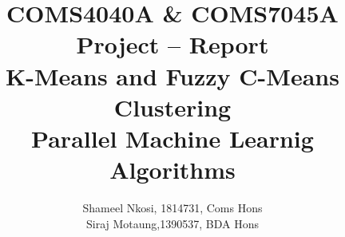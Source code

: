 


\title{COMS4040A \& COMS7045A Project  -- Report
    \\  K-Means and Fuzzy C-Means Clustering
    \\ Parallel Machine Learnig Algorithms
    }
\author{Shameel Nkosi, 1814731,  Coms Hons \\
        Siraj Motaung,1390537, BDA Hons}
\maketitle 
\pagestyle{fancy}
\fancyhf{}
\fancyhead[R]{\thepage}

\newpage
\tableofcontents
\newpage
{} 

